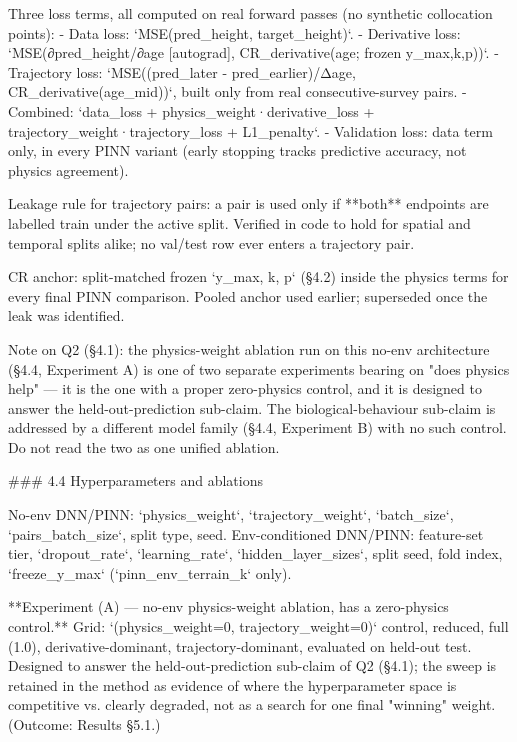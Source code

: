 Three loss terms, all computed on real forward passes (no synthetic collocation points):
- Data loss: `MSE(pred_height, target_height)`.
- Derivative loss: `MSE(∂pred_height/∂age [autograd], CR_derivative(age; frozen y_max,k,p))`.
- Trajectory loss: `MSE((pred_later - pred_earlier)/Δage, CR_derivative(age_mid))`, built only from real consecutive-survey pairs.
- Combined: `data_loss + physics_weight·derivative_loss + trajectory_weight·trajectory_loss + L1_penalty`.
- Validation loss: data term only, in every PINN variant (early stopping tracks predictive accuracy, not physics agreement).

Leakage rule for trajectory pairs: a pair is used only if **both** endpoints are labelled train under the active split. Verified in code to hold for spatial and temporal splits alike; no val/test row ever enters a trajectory pair.

CR anchor: split-matched frozen `y_max, k, p` (§4.2) inside the physics terms for every final PINN comparison. Pooled anchor used earlier; superseded once the leak was identified.

Note on Q2 (§4.1): the physics-weight ablation run on this no-env architecture (§4.4, Experiment A) is one of two separate experiments bearing on "does physics help" — it is the one with a proper zero-physics control, and it is designed to answer the held-out-prediction sub-claim. The biological-behaviour sub-claim is addressed by a different model family (§4.4, Experiment B) with no such control. Do not read the two as one unified ablation.

### 4.4 Hyperparameters and ablations

No-env DNN/PINN: `physics_weight`, `trajectory_weight`, `batch_size`, `pairs_batch_size`, split type, seed.
Env-conditioned DNN/PINN: feature-set tier, `dropout_rate`, `learning_rate`, `hidden_layer_sizes`, split seed, fold index, `freeze_y_max` (`pinn_env_terrain_k` only).

**Experiment (A) — no-env physics-weight ablation, has a zero-physics control.** Grid: `(physics_weight=0, trajectory_weight=0)` control, reduced, full (1.0), derivative-dominant, trajectory-dominant, evaluated on held-out test. Designed to answer the held-out-prediction sub-claim of Q2 (§4.1); the sweep is retained in the method as evidence of where the hyperparameter space is competitive vs. clearly degraded, not as a search for one final "winning" weight. (Outcome: Results §5.1.)

